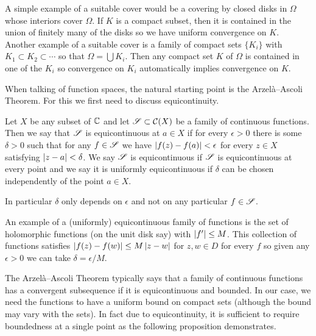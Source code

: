 A simple example of a suitable cover would be a covering by closed disks in $\Omega$ whose interiors cover $\Omega$. If $K$ is a compact subset, then it is contained in the union of finitely many of the disks so we have uniform convergence on $K$. Another example of a suitable cover is a family of compact sets $\{K_i\}$ with $K_1 \subset K_2 \subset \cdots$ so that $\Omega = \bigcup K_i$. Then any compact set $K$ of $\Omega$ is contained in one of the $K_i$ so convergence on $K_i$ automatically implies convergence on $K$. 

When talking of function spaces, the natural starting point is the Arzelà–Ascoli Theorem. For this we first need to discuss equicontinuity.
\begin{definition}[Equicontinuity]
    Let $X$ be any subset of $\mathbb{C}$ and let $\mathscr{S} \subset \mathcal{C}(X)$ be a family of continuous functions. Then we say that $\mathscr{S}$ is equicontinuous at $a \in X$ if for every $\epsilon > 0$ there is some $\delta > 0$ such that for any $f \in \mathscr{S}$ we have $\left|f(z) - f(a)\right| < \epsilon$ for every $z \in X$ satisfying $\left|z - a\right| < \delta$. We say $\mathscr{S}$ is equicontinuous if $\mathscr{S}$ is equicontinuous at every point and we say it is uniformly equicontinuous if $\delta$ can be chosen independently of the point $a \in X$.
\end{definition}
\begin{remark}
    In particular $\delta$ only depends on $\epsilon$ and not on any particular $f \in \mathscr{S}$. 
\end{remark}

\begin{example}
An example of a (uniformly) equicontinuous family of functions is the set of holomorphic functions (on the unit disk say) with $\left|f'\right| \leq M$. This collection of functions satisfies $\left|f(z) - f(w)\right| \leq M\left|z - w\right|$ for $z, w \in D$ for every $f$ so given any $\epsilon > 0$ we can take $\delta = \epsilon/M$.
\end{example}

The Arzelà–Ascoli Theorem typically says that a family of continuous functions has a convergent subsequence if it is equicontinuous and bounded. In our case, we need the functions to have a uniform bound on compact sets (although the bound may vary with the sets). In fact due to equicontinuity, it is sufficient to require boundedness at a single point as the following proposition demonstrates.

